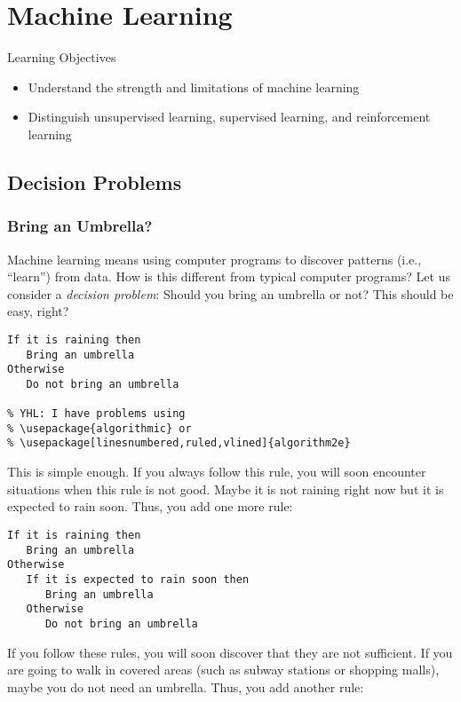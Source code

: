 \chapter{Machine Learning}

Learning Objectives

\begin{itemize}
\item Understand the strength and limitations of machine learning
\item Distinguish  unsupervised learning,  supervised learning, and reinforcement learning
\end{itemize}

\section{Decision Problems}


\subsection{Bring an Umbrella?}

Machine learning means using computer programs to discover patterns
(i.e., ``learn'') from data. How is this different from typical
computer programs?  Let us consider a {\it decision problem}:
Should you bring an umbrella or not?  This should be easy, right?


\begin{verbatim}
If it is raining then
   Bring an umbrella
Otherwise
   Do not bring an umbrella

% YHL: I have problems using 
% \usepackage{algorithmic} or
% \usepackage[linesnumbered,ruled,vlined]{algorithm2e}
\end{verbatim}

This is simple enough.  If you always follow this rule, you will soon
encounter situations when this rule is not good.  Maybe it is not raining
right now but it is expected to rain soon. Thus, you add one more rule:

\begin{verbatim}
If it is raining then
   Bring an umbrella
Otherwise
   If it is expected to rain soon then
      Bring an umbrella
   Otherwise
      Do not bring an umbrella
\end{verbatim}

If you follow these rules, you will soon discover that they are not
sufficient.  If you are going to walk in covered areas (such as subway
stations or shopping malls), maybe you do not need an umbrella.  Thus,
you add another rule:

